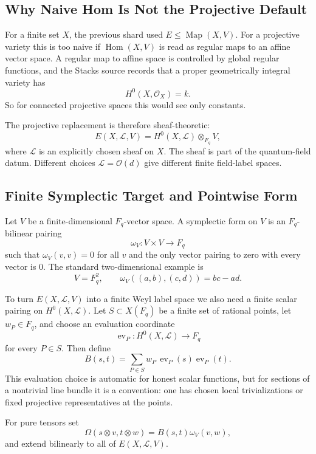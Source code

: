 \subsection{Why Naive Hom Is Not the Projective Default}

For a finite set \(X\), the previous shard used \(E\leq\operatorname{Map}(X,V)\).
For a projective variety this is too naive if \(\operatorname{Hom}(X,V)\) is
read as regular maps to an affine vector space.  A regular map to affine
space is controlled by global regular functions, and the Stacks source records
that a proper geometrically integral variety has
\[
  H^0(X,\mathcal O_X)=k.
\]
So for connected projective spaces this would see only constants.

The projective replacement is therefore sheaf-theoretic:
\[
  E(X,\mathcal L,V)=H^0(X,\mathcal L)\otimes_{F_q}V,
\]
where \(\mathcal L\) is an explicitly chosen sheaf on \(X\).  The sheaf is part
of the quantum-field datum.  Different choices \(\mathcal L=\mathcal O(d)\)
give different finite field-label spaces.

\subsection{Finite Symplectic Target and Pointwise Form}

Let \(V\) be a finite-dimensional \(F_q\)-vector space.  A symplectic form on
\(V\) is an \(F_q\)-bilinear pairing
\[
  \omega_V:V\times V\to F_q
\]
such that \(\omega_V(v,v)=0\) for all \(v\) and the only vector pairing to
zero with every vector is \(0\).  The standard two-dimensional example is
\[
  V=F_q^2,\qquad
  \omega_V((a,b),(c,d))=bc-ad.
\]

To turn \(E(X,\mathcal L,V)\) into a finite Weyl label space we also need a
finite scalar pairing on \(H^0(X,\mathcal L)\).  Let \(S\subset X(F_q)\) be a
finite set of rational points, let \(w_P\in F_q\), and choose an evaluation
coordinate
\[
  \operatorname{ev}_P:H^0(X,\mathcal L)\to F_q
\]
for every \(P\in S\).  Then define
\[
  B(s,t)=\sum_{P\in S}w_P\,\operatorname{ev}_P(s)\operatorname{ev}_P(t).
\]
This evaluation choice is automatic for honest scalar functions, but for
sections of a nontrivial line bundle it is a convention: one has chosen local
trivializations or fixed projective representatives at the points.

For pure tensors set
\[
  \Omega(s\otimes v,t\otimes w)=B(s,t)\omega_V(v,w),
\]
and extend bilinearly to all of \(E(X,\mathcal L,V)\).

